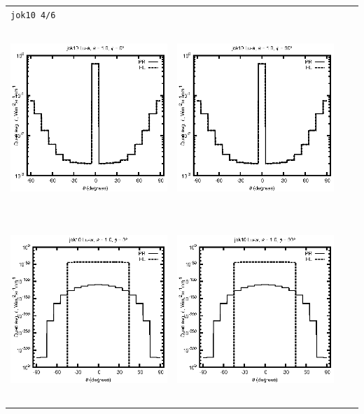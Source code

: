 \begin{tabular}{c c c c}
\multicolumn{4}{l}{\texttt{jok10 4/6}} \\
\includegraphics[height=7cm]{../eps/jok10_Lu_a_fwd.eps} &
\includegraphics[height=7cm]{../eps/jok10_Lu_a_cross.eps}\\
\includegraphics[height=7cm]{../eps/jok10_Lu_w_fwd.eps} &
\includegraphics[height=7cm]{../eps/jok10_Lu_w_cross.eps} \\

\end{tabular}
